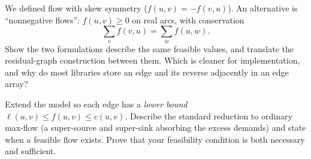 \begin{exercise}
We defined flow with skew symmetry ($f(u,v)=-f(v,u)$). An alternative is
``nonnegative flows'': $f(u,v)\ge 0$ on real arcs, with conservation 
\[
  \sum_v f(v,u) = \sum_w f(u,w).
\]
Show the two formulations describe the same feasible values, and
translate the residual-graph construction between them. Which is cleaner for
implementation, and why do most libraries store an edge and its reverse adjacently
in an edge array?
\end{exercise}

\begin{exercise}
Extend the model so each edge has a \emph{lower bound} $\ell(u,v)\le f(u,v)\le
c(u,v)$. Describe the standard reduction to ordinary max-flow (a super-source and
super-sink absorbing the excess demands) and state when a feasible flow exists.
Prove that your feasibility condition is both necessary and sufficient.
\end{exercise}
